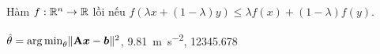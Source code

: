 \begin{demo}
\begin{definition} Hàm $f:\mathbb{R}^n\to\mathbb{R}$ lồi nếu $f(\lambda x+(1-\lambda)y)\le\lambda f(x)+(1-\lambda)f(y)$. \end{definition}
$\hat\theta = \operatorname*{arg\,min}_\theta \lVert\mathbf{A}\bm{x}-\bm{b}\rVert^2$, \quad \SI{9.81}{\metre\per\second\squared}, \quad \num{12345.678}
\end{demo}
